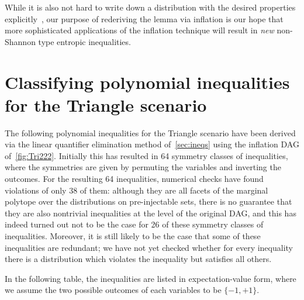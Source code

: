 While it is also not hard to write down a distribution with the desired properties explicitly~\cite[Lemma~15.8]{yeung_network_2008}, our purpose of rederiving the lemma via inflation is our hope that more sophisticated applications of the inflation technique will result in \emph{new} non-Shannon type entropic inequalities.


\section{Classifying polynomial inequalities for the Triangle scenario}
\label{sec:38ineqs}

The following polynomial inequalities for the Triangle scenario have been derived via the linear quantifier elimination method of~\cref{sec:ineqs} using the inflation DAG of~\cref{fig:Tri222}. Initially this has resulted in 64 symmetry classes of inequalities, where the symmetries are given by permuting the variables and inverting the outcomes. For the resulting 64 inequalities, numerical checks have found violations of only 38 of them: although they are all facets of the marginal polytope over the distributions on pre-injectable sets, there is no guarantee that they are also nontrivial inequalities at the level of the original DAG, and this has indeed turned out not to be the case for 26 of these symmetry classes of inequalities. Moreover, it is still likely to be the case that some of these inequalities are redundant; we have not yet checked whether for every inequality there is a distribution which violates the inequality but satisfies all others.

In the following table, the inequalities are listed in expectation-value form, where we assume the two possible outcomes of each variables to be $\{-1,+1\}$.


